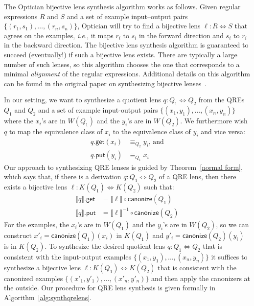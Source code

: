 \documentclass[acmsmall,review,anonymous]{acmart}
\newcommand{\codefont}[1]{\ensuremath{\mathsf{#1}}}
\newcommand{\kw}[1]{\codefont{#1}}
\newcommand{\canonize}{\ensuremath{\kw{canonize}}}
\newcommand{\get}{\ensuremath{\kw{get}}}
\newcommand{\lput}{\ensuremath{\kw{put}}}
\begin{document}
The Optician bijective lens synthesis algorithm works as follows. Given regular
expressions $R$ and $S$ and a set of example input--output pairs $\{(r_1,
s_1),\allowbreak \ldots,\allowbreak (r_n, s_n)\}$, Optician will try to find a
bijective lens $\ell : R \Leftrightarrow S$ that agrees on the examples,
\textit{i.e.}, it maps $r_i$ to $s_i$ in the forward direction and $s_i$ to
$r_i$ in the backward direction. The bijective lens synthesis algorithm is
guaranteed to succeed (eventually!) if such a bijective lens exists. There are
typically a large number of such lenses, so this algorithm chooses the one that
corresponds to a minimal \emph{alignment} of the regular expressions. Additional
details on this algorithm can be found in the original paper on synthesizing
bijective lenses~\cite{optician}.

In our setting, we want to synthesize a quotient lens $q: Q_1 \Leftrightarrow
Q_2$ from the QREs $Q_1$ and $Q_2$ and a set of example input-output pairs
$\{(x_1, y_1),\allowbreak \ldots,\allowbreak (x_n, y_n)\}$ where the $x_i$'s are
in $W(Q_1)$ and the $y_i$'s are in $W(Q_2)$. We furthermore wish $q$ to map the
equivalence class of $x_i$ to the equivalence class of $y_i$ and vice versa:
\begin{align*}
q.\get(x_i) &\equiv_{Q_2} y_i \text{, and}\\
q.\lput(y_i) &\equiv_{Q_1} x_i
\end{align*}
Our approach to synthesizing QRE lenses is guided by Theorem~\ref{normal form},
which says that, if there is a derivation $q : Q_1 \Leftrightarrow Q_2$ of a
QRE lens, then there exists a bijective lens $\ell : K(Q_1) \Leftrightarrow
K(Q_2)$ such that:
\begin{align*}
\llbracket q \rrbracket.\get &= \llbracket \ell \rrbracket\circ \canonize(Q_1)\\
\llbracket q \rrbracket.\lput &= \llbracket \ell \rrbracket^{-1} \circ
\canonize(Q_2)
\end{align*}
For the examples, the $x_i$'s are in $W(Q_1)$ and the $y_i$'s are 
in $W(Q_2)$, so we can construct ${x'_i} = \canonize(Q_1)(x_i)$ in $K(Q_1)$
and ${y'_i} = \canonize(Q_2)(y_i)$ is in $K(Q_2)$. To synthesize the desired
quotient lens $q: Q_1 \Leftrightarrow Q_2$ that is consistent with the
input-output examples $\{(x_1, y_1), \ldots, (x_n, y_n)\}$ it suffices to
synthesize a bijective lens $\ell : K(Q_1) \Leftrightarrow K(Q_2)$ that is
consistent with the canonized examples $\{({x'_1}, {y'_1}), \ldots, ({x'_n},
{y'_n})\}$ and then apply the canonizers at the outside. Our procedure for QRE
lens synthesis is given formally in Algorithm~\ref{alg:synthqrelens}.
\end{document}

